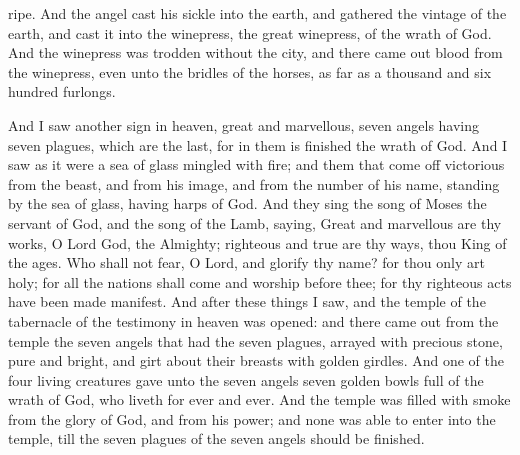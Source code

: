 ripe. And the angel cast his sickle into the earth, and gathered the vintage of the earth, and cast it into the winepress, the great winepress, of the wrath of God. And the winepress was trodden without the city, and there came out blood from the winepress, even unto the bridles of the horses, as far as a thousand and six hundred furlongs. 

And I saw another sign in heaven, great and marvellous, seven angels having seven plagues, which are the last, for in them is finished the wrath of God.  And I saw as it were a sea of glass mingled with fire; and them that come off victorious from the beast, and from his image, and from the number of his name, standing by the sea of glass, having harps of God. And they sing the song of Moses the servant of God, and the song of the Lamb, saying, Great and marvellous are thy works, O Lord God, the Almighty; righteous and true are thy ways, thou King of the ages. Who shall not fear, O Lord, and glorify thy name? for thou only art holy; for all the nations shall come and worship before thee; for thy righteous acts have been made manifest.  And after these things I saw, and the temple of the tabernacle of the testimony in heaven was opened: and there came out from the temple the seven angels that had the seven plagues, arrayed with precious stone, pure and bright, and girt about their breasts with golden girdles. And one of the four living creatures gave unto the seven angels seven golden bowls full of the wrath of God, who liveth for ever and ever. And the temple was filled with smoke from the glory of God, and from his power; and none was able to enter into the temple, till the seven plagues of the seven angels should be finished. 

